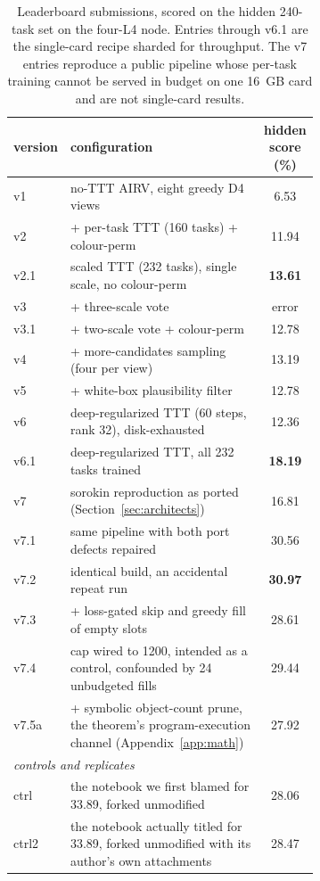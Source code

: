 \documentclass[11pt]{article}
\begin{document}
\begin{table}[tbp]
\centering
\caption{Leaderboard submissions, scored on the hidden 240-task set on the four-L4 node. Entries
through v6.1 are the single-card recipe sharded for throughput. The v7 entries reproduce a public
pipeline whose per-task training cannot be served in budget on one 16~GB card and are not single-card
results.}
\label{tab:versions}
\begin{tabular}{@{}lp{0.68\linewidth}c@{}}
\toprule
version & configuration & hidden score (\%) \\
\midrule
v1   & no-TTT AIRV, eight greedy D4 views            & 6.53 \\
v2   & + per-task TTT (160 tasks) + colour-perm      & 11.94 \\
v2.1 & scaled TTT (232 tasks), single scale, no colour-perm & \textbf{13.61} \\
v3   & + three-scale vote                            & error \\
v3.1 & + two-scale vote + colour-perm                & 12.78 \\
v4   & + more-candidates sampling (four per view)    & 13.19 \\
v5   & + white-box plausibility filter               & 12.78 \\
v6   & deep-regularized TTT (60 steps, rank 32), disk-exhausted & 12.36 \\
v6.1 & deep-regularized TTT, all 232 tasks trained   & \textbf{18.19} \\
v7   & sorokin reproduction as ported (Section~\ref{sec:architects}) & 16.81 \\
v7.1 & same pipeline with both port defects repaired   & 30.56 \\
v7.2 & identical build, an accidental repeat run & \textbf{30.97} \\
v7.3 & + loss-gated skip and greedy fill of empty slots & 28.61 \\
v7.4 & cap wired to 1200, intended as a control, confounded by 24 unbudgeted fills & 29.44 \\
v7.5a & + symbolic object-count prune, the theorem's program-execution channel (Appendix~\ref{app:math}) & 27.92 \\
\midrule
\multicolumn{3}{l}{\itshape controls and replicates} \\
ctrl & the notebook we first blamed for 33.89, forked unmodified & 28.06 \\
ctrl2 & the notebook actually titled for 33.89, forked unmodified with its author's own attachments & 28.47 \\

\end{tabular}
\end{table}
\end{document}
